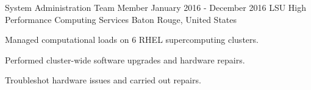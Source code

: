 \begin{cventries}
	\cventry
	{System Administration Team Member} %
	{January 2016 - December 2016} %
	{LSU High Performance Computing Services} %
	{Baton Rouge, United States} %
	{
	\begin{cvitems} %
		\item {Managed computational loads on 6 RHEL supercomputing clusters.}
		\item {Performed cluster-wide software upgrades and hardware repairs.}
		\item {Troubleshot hardware issues and carried out repairs.}
	\end{cvitems}
	}

\end{cventries}
